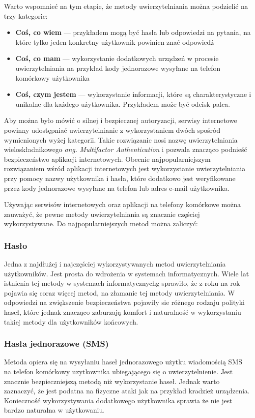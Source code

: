 Warto wspomnieć na tym etapie, że metody uwierzytelniania można podzielić na trzy kategorie:
\begin{itemize}
  \item \textbf{Coś, co wiem} --- przykładem mogą być hasła lub odpowiedzi na pytania, na które tylko jeden konkretny użytkownik powinien znać odpowiedź
  \item \textbf{Coś, co mam} --- wykorzystanie dodatkowych urządzeń w procesie uwierzytelniania na przykład kody jednorazowe wysyłane na telefon komórkowy użytkownika
  \item \textbf{Coś, czym jestem} --- wykorzystanie informacji, które są charakterystyczne i unikalne dla każdego użytkownika. Przykładem może być odcisk palca.
\end{itemize}

Aby można było mówić o silnej i bezpiecznej autoryzacji, serwisy internetowe powinny udostępniać uwierzytelnianie z wykorzystaniem dwóch spośród wymienionych wyżej kategorii. Takie rozwiązanie nosi nazwę uwierzytelniania wieloskładnikowego \emph{ang. Multifactor Authentication} i pozwala znacząco podnieść bezpieczeństwo aplikacji internetowych. Obecnie najpopularniejszym rozwiązaniem wśród aplikacji internetowych jest wykorzystanie uwierzytelniania przy pomocy nazwy użytkownika i hasła, które dodatkowo jest weryfikowane przez kody jednorazowe wysyłane na telefon lub adres e-mail użytkownika.

Używając serwisów internetowych oraz aplikacji na telefony komórkowe można zauważyć, że pewne metody uwierzytelniania są znacznie częściej wykorzystywane. Do najpopularniejszych metod można zaliczyć:
\subsubsection{Hasło} Jedna z najdłużej i najczęściej wykorzystywanych metod uwierzytelniania użytkowników. Jest prosta do wdrożenia w systemach informatycznych. Wiele lat istnienia tej metody w systemach informatycznychg sprawiło, że z roku na rok pojawia się coraz więcej metod, na złamanie tej metody uwierzytelniania. W odpowiedzi na zwiększenie bezpieczeństwa pojawiły sie różnego rodzaju polityki haseł, które jednak znacząco zaburzają komfort i naturalność w wykorzystaniu takiej metody dla użytkowników końcowych.
\subsubsection{Hasła jednorazowe (SMS)} Metoda opiera się na wysyłaniu haseł jednorazowego użytku wiadomością SMS na telefon komórkowy uzytkownika ubiegającego się o uwierzytelnienie. Jest znacznie bezpieczniejszą metodą niż wykorzystanie haseł. Jednak warto zaznaczyć, że jest podatna na fizyczne ataki jak na przykład kradzież urządzenia. Konieczność wykorzystywania dodatkowego użytkownika sprawia że nie jest bardzo naturalna w użytkowaniu.
